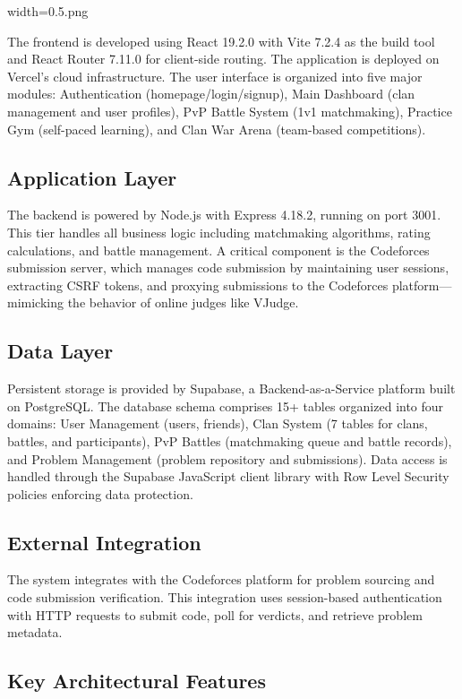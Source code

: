 width=0.5\linewidthimage.png\documentclass[12pt,a4paper]{article}
\begin{document}
The frontend is developed using React 19.2.0 with Vite 7.2.4 as the build tool and React Router 7.11.0 for client-side routing. The application is deployed on Vercel's cloud infrastructure. The user interface is organized into five major modules: Authentication (homepage/login/signup), Main Dashboard (clan management and user profiles), PvP Battle System (1v1 matchmaking), Practice Gym (self-paced learning), and Clan War Arena (team-based competitions).

\subsection{Application Layer}

The backend is powered by Node.js with Express 4.18.2, running on port 3001. This tier handles all business logic including matchmaking algorithms, rating calculations, and battle management. A critical component is the Codeforces submission server, which manages code submission by maintaining user sessions, extracting CSRF tokens, and proxying submissions to the Codeforces platform—mimicking the behavior of online judges like VJudge.

\subsection{Data Layer}

Persistent storage is provided by Supabase, a Backend-as-a-Service platform built on PostgreSQL. The database schema comprises 15+ tables organized into four domains: User Management (users, friends), Clan System (7 tables for clans, battles, and participants), PvP Battles (matchmaking queue and battle records), and Problem Management (problem repository and submissions). Data access is handled through the Supabase JavaScript client library with Row Level Security policies enforcing data protection.

\subsection{External Integration}

The system integrates with the Codeforces platform for problem sourcing and code submission verification. This integration uses session-based authentication with HTTP requests to submit code, poll for verdicts, and retrieve problem metadata.

\subsection{Key Architectural Features}
\end{document}
